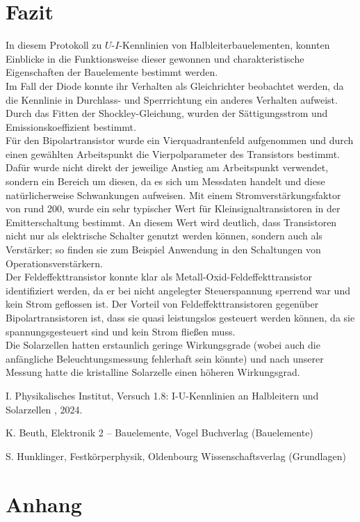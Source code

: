 \documentclass[12pt,a4paper,ngerman]{report}
\begin{document}
\chapter{Fazit}
In diesem Protokoll zu $U$-$I$-Kennlinien von Halbleiterbauelementen, konnten Einblicke in die Funktionsweise dieser gewonnen und charakteristische Eigenschaften der Bauelemente bestimmt werden.\\
Im Fall der Diode konnte ihr Verhalten als Gleichrichter beobachtet werden, da die Kennlinie in Durchlass- und Sperrrichtung ein anderes Verhalten aufweist. Durch das Fitten der Shockley-Gleichung, wurden der Sättigungsstrom und Emissionskoeffizient bestimmt.\\
Für den Bipolartransistor wurde ein Vierquadrantenfeld aufgenommen und durch einen gewählten Arbeitspunkt die Vierpolparameter des Transistors bestimmt. Dafür wurde nicht direkt der jeweilige Anstieg am Arbeitspunkt verwendet, sondern ein Bereich um diesen, da es sich um Messdaten handelt und diese natürlicherweise Schwankungen aufweisen. Mit einem Stromverstärkungsfaktor von rund 200, wurde ein sehr typischer Wert für Kleinsignaltransistoren in der Emitterschaltung bestimmt. An diesem Wert wird deutlich, dass Transistoren nicht nur als elektrische Schalter genutzt werden können, sondern auch als Verstärker; so finden sie zum Beispiel Anwendung in den Schaltungen von Operationsverstärkern.\\
Der Feldeffekttransistor konnte klar als  Metall-Oxid-Feldeffekttransistor identifiziert werden, da er bei nicht angelegter Steuerspannung sperrend war und kein Strom geflossen ist. Der Vorteil von Feldeffekttransistoren gegenüber Bipolartransistoren ist, dass sie quasi leistungslos gesteuert werden können, da sie spannungsgesteuert sind und kein Strom fließen muss.\\
Die Solarzellen hatten erstaunlich geringe Wirkungsgrade (wobei auch die anfängliche Beleuchtungsmessung fehlerhaft sein könnte) und nach unserer Messung hatte die kristalline Solarzelle einen höheren Wirkungsgrad.



	\listoffigures
	
	\begin{thebibliography}{111} 
		I. Physikalisches Institut, \glqq Versuch 1.8: I-U-Kennlinien an Halbleitern
		und Solarzellen \grqq{}, 2024.
		
		K. Beuth, \glqq Elektronik 2 – Bauelemente\grqq, Vogel Buchverlag (Bauelemente)
		
		S. Hunklinger, \glqq Festkörperphysik\grqq, Oldenbourg Wissenschaftsverlag (Grundlagen)
		
		
		
	\end{thebibliography}


\chapter*{Anhang} \label{ch:Anhang}
\FloatBarrier
\end{document}
